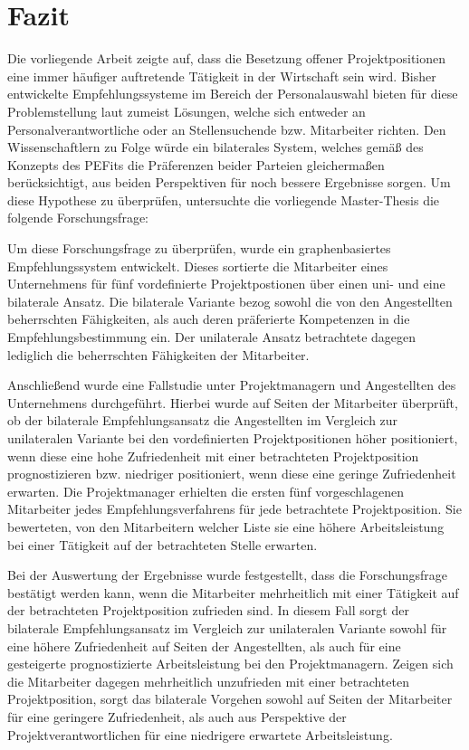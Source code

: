 \chapter{Fazit}
\label{ch:fazit}
Die vorliegende Arbeit zeigte auf, dass die Besetzung offener Projektpositionen eine immer häufiger auftretende Tätigkeit in der Wirtschaft sein wird. Bisher entwickelte Empfehlungssysteme im Bereich der Personalauswahl bieten für diese Problemstellung laut \textcite{malinowski:2008} zumeist Lösungen, welche sich entweder an Personalverantwortliche oder an Stellensuchende bzw. Mitarbeiter richten. Den Wissenschaftlern zu Folge würde ein bilaterales System, welches gemäß des Konzepts des \acfp{PEFit} die Präferenzen beider Parteien gleichermaßen berücksichtigt, aus beiden Perspektiven für noch bessere Ergebnisse sorgen. Um diese Hypothese zu überprüfen, untersuchte die vorliegende Master-Thesis die folgende Forschungsfrage: \forschungsfrage

Um diese Forschungsfrage zu überprüfen, wurde ein graphenbasiertes Empfehlungssystem entwickelt. Dieses sortierte die Mitarbeiter eines Unternehmens für fünf vordefinierte Projektpostionen über einen uni- und eine bilaterale Ansatz. Die bilaterale Variante bezog sowohl die von den Angestellten beherrschten Fähigkeiten, als auch deren präferierte Kompetenzen in die Empfehlungsbestimmung ein. Der unilaterale Ansatz betrachtete dagegen lediglich die beherrschten Fähigkeiten der Mitarbeiter.

Anschließend wurde eine Fallstudie unter Projektmanagern und Angestellten des Unternehmens durchgeführt. Hierbei wurde auf Seiten der Mitarbeiter überprüft, ob der bilaterale Empfehlungsansatz die Angestellten im Vergleich zur unilateralen Variante bei den vordefinierten Projektpositionen höher positioniert, wenn diese eine hohe Zufriedenheit mit einer betrachteten Projektposition prognostizieren bzw. niedriger positioniert, wenn diese eine geringe Zufriedenheit erwarten. Die Projektmanager erhielten die ersten fünf vorgeschlagenen Mitarbeiter jedes Empfehlungsverfahrens für jede betrachtete Projektposition. Sie bewerteten, von den Mitarbeitern welcher Liste sie eine höhere Arbeitsleistung bei einer Tätigkeit auf der betrachteten Stelle erwarten.

Bei der Auswertung der Ergebnisse wurde festgestellt, dass die Forschungsfrage bestätigt werden kann, wenn die Mitarbeiter mehrheitlich mit einer Tätigkeit auf der betrachteten Projektposition zufrieden sind. In diesem Fall sorgt der bilaterale Empfehlungsansatz im Vergleich zur unilateralen Variante sowohl für eine höhere Zufriedenheit auf Seiten der Angestellten, als auch für eine gesteigerte prognostizierte Arbeitsleistung bei den Projektmanagern. Zeigen sich die Mitarbeiter dagegen mehrheitlich unzufrieden mit einer betrachteten Projektposition, sorgt das bilaterale Vorgehen sowohl auf Seiten der Mitarbeiter für eine geringere Zufriedenheit, als auch aus Perspektive der Projektverantwortlichen für eine niedrigere erwartete Arbeitsleistung.

